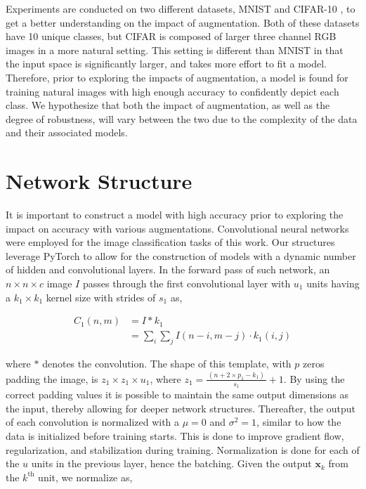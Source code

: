 \documentclass[conference]{IEEEtran}
\newcommand{\xv}{\mathbf{x}}
\begin{document}
Experiments are conducted on two different datasets, MNIST \cite{MNIST} and CIFAR-10 \cite{CIFAR10}, to get a better understanding on the impact of augmentation. Both of these datasets have 10 unique classes, but CIFAR is composed of larger three channel RGB images in a more natural setting. This setting is different than MNIST in that the input space is significantly larger, and takes more effort to fit a model. Therefore, prior to exploring the impacts of augmentation, a model is found for training natural images with high enough accuracy to confidently depict each class. We hypothesize that both the impact of augmentation, as well as the degree of robustness, will vary between the two due to the complexity of the data and their associated models.

\section{Network Structure}

It is important to construct a model with high accuracy prior to exploring the impact on accuracy with various augmentations. Convolutional neural networks were employed for the image classification tasks of this work. Our structures leverage PyTorch to allow for the construction of models with a dynamic number of hidden and convolutional layers. In the forward pass of such network, an $n \times n \times c$ image $I$ passes through the first convolutional layer with $u_1$ units having a $k_1 \times k_1$ kernel size with strides of $s_1$ as,

\begin{align*}
C_1(n, m) &= I * k_1 \\
&= \sum_i{\sum_j{I(n - i, m - j) \cdot k_1(i, j)}}
\end{align*}

\noindent
where $*$ denotes the convolution. The shape of this template, with $p$ zeros padding the image, is $z_1 \times z_1 \times u_1$, where $z_1 = \frac{\,( n + 2\times p_1 - k_1 )\,}{\,s_1 \,}+ 1$. By using the correct padding values it is possible to maintain the same output dimensions as the input, thereby allowing for deeper network structures. Thereafter, the output of each convolution is normalized with a $\mu = 0$ and $\sigma^2 = 1$, similar to how the data is initialized before training starts. This is done to improve gradient flow, regularization, and stabilization during training. Normalization is done for each of the $u$ units in the previous layer, hence the batching. Given the output $\xv_k$ from the $k^{\text{th}}$ unit, we normalize as,
\end{document}
